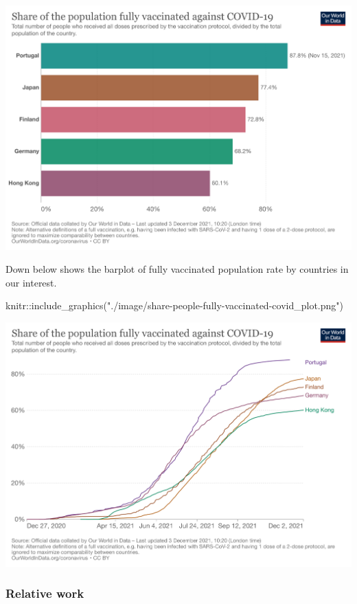 \documentclass[
]{article}
\newenvironment{Shaded}{\begin{snugshade}}{\end{snugshade}}
\newcommand{\FunctionTok}[1]{\textcolor[rgb]{0.00,0.00,0.00}{#1}}
\newcommand{\NormalTok}[1]{#1}
\newcommand{\SpecialCharTok}[1]{\textcolor[rgb]{0.00,0.00,0.00}{#1}}
\newcommand{\StringTok}[1]{\textcolor[rgb]{0.31,0.60,0.02}{#1}}
\begin{document}
\includegraphics{./image/share-people-fully-vaccinated-covid_bar.png}

Down below shows the barplot of fully vaccinated population rate by
countries in our interest.

\begin{Shaded}
\begin{Highlighting}[]
\NormalTok{knitr}\SpecialCharTok{::}\FunctionTok{include\_graphics}\NormalTok{(}\StringTok{"./image/share{-}people{-}fully{-}vaccinated{-}covid\_plot.png"}\NormalTok{)}
\end{Highlighting}
\end{Shaded}

\includegraphics{./image/share-people-fully-vaccinated-covid_plot.png}

\hypertarget{relative-work}{%
\subsubsection{Relative work}\label{relative-work}}
\end{document}
